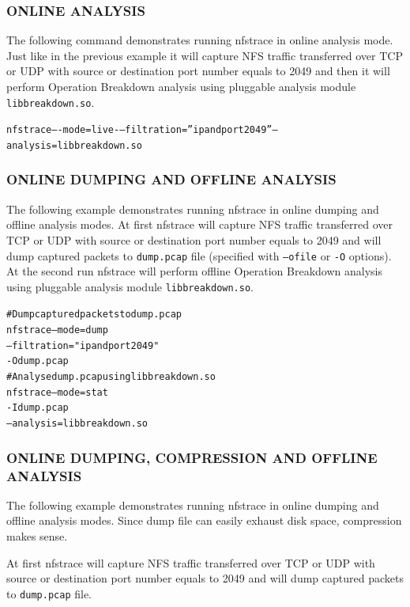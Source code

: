 \documentclass[oneside]{article}
\newcommand{\code}[1]{\texttt{#1}}
\newcommand{\gls}{}
\newcommand*{\textfile}[1]{\textsf{#1}}
\newcommand*{\textprog}[1]{\textfile{#1}}
\begin{document}
\subsubsection{ONLINE ANALYSIS}

The following command demonstrates running \textprog{nfstrace} in online analysis mode.
Just like in the previous example it will capture \gls{NFS} traffic transferred
over TCP or UDP with source or destination port number equals to 2049 and then
it will perform Operation Breakdown analysis using pluggable analysis module
\code{libbreakdown.so}.
\begin{alltt}
nfstrace –-mode=live -–filtration=”ip and port 2049” --analysis=libbreakdown.so
\end{alltt}

\subsubsection{ONLINE DUMPING AND OFFLINE ANALYSIS}

The following example demonstrates running \textprog{nfstrace} in online
dumping and offline analysis modes.  At first \textprog{nfstrace} will capture
\gls{NFS} traffic transferred over TCP or UDP with source or destination port
number equals to 2049 and will dump captured packets to \code{dump.pcap} file
(specified with \code{--ofile} or \code{-O} options).  At the second run
\textprog{nfstrace} will perform offline Operation Breakdown analysis using
pluggable analysis module \code{libbreakdown.so}.  
\begin{alltt}
\# Dump captured packets to dump.pcap 
nfstrace --mode=dump
         --filtration="ip and port 2049"
         -O dump.pcap 
\# Analyse dump.pcap using libbreakdown.so 
nfstrace --mode=stat
         -I dump.pcap
         --analysis=libbreakdown.so
\end{alltt}

\subsubsection{ONLINE DUMPING, COMPRESSION AND OFFLINE ANALYSIS}

The following example demonstrates running \textprog{nfstrace} in online dumping and
offline analysis modes. Since dump file can easily exhaust disk space,
compression makes sense.

At first \textprog{nfstrace} will capture \gls{NFS} traffic transferred over TCP or UDP
with source or destination port number equals to 2049 and will dump captured
packets to \code{dump.pcap} file.
\end{document}
